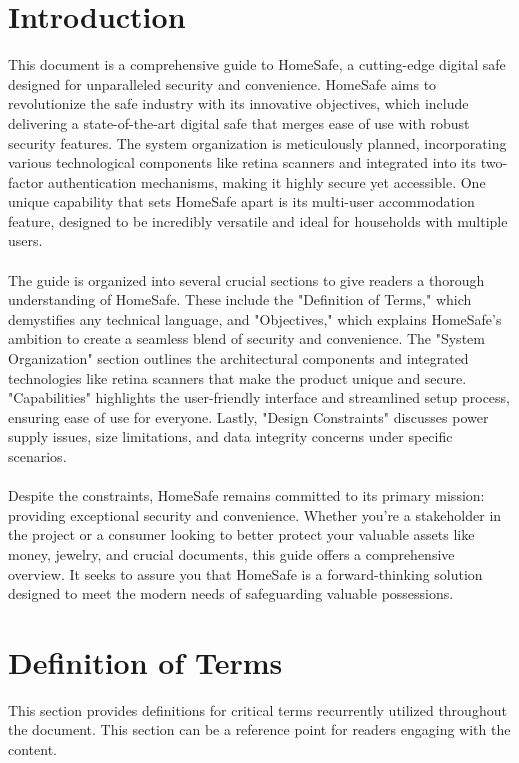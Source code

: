\documentclass{article}
\begin{document}
\section{Introduction}
This document is a comprehensive guide to HomeSafe, a cutting-edge digital safe designed for unparalleled security and convenience. HomeSafe aims to revolutionize the safe industry with its innovative objectives, which include delivering a state-of-the-art digital safe that merges ease of use with robust security features. The system organization is meticulously planned, incorporating various technological components like retina scanners and integrated into its two-factor authentication mechanisms, making it highly secure yet accessible. One unique capability that sets HomeSafe apart is its multi-user accommodation feature, designed to be incredibly versatile and ideal for households with multiple users. \\ \\
The guide is organized into several crucial sections to give readers a thorough understanding of HomeSafe. These include the "Definition of Terms," which demystifies any technical language, and "Objectives," which explains HomeSafe's ambition to create a seamless blend of security and convenience. The "System Organization" section outlines the architectural components and integrated technologies like retina scanners that make the product unique and secure. "Capabilities" highlights the user-friendly interface and streamlined setup process, ensuring ease of use for everyone. Lastly, "Design Constraints" discusses power supply issues, size limitations, and data integrity concerns under specific scenarios. \\ \\
Despite the constraints, HomeSafe remains committed to its primary mission: providing exceptional security and convenience. Whether you're a stakeholder in the project or a consumer looking to better protect your valuable assets like money, jewelry, and crucial documents, this guide offers a comprehensive overview. It seeks to assure you that HomeSafe is a forward-thinking solution designed to meet the modern needs of safeguarding valuable possessions.

\section{Definition of Terms}
This section provides definitions for critical terms recurrently utilized throughout the document. This section can be a reference point for readers engaging with the content.
\end{document}
